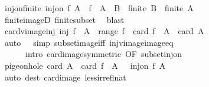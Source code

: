 \begin{isabellebody}
\ inj{\isacharunderscore}{\kern0pt}on{\isacharunderscore}{\kern0pt}finite{\isacharcolon}{\kern0pt}\ {\isachardoublequoteopen}inj{\isacharunderscore}{\kern0pt}on\ f\ A\ {\isasymLongrightarrow}\ f\ {\isacharbackquote}{\kern0pt}\ A\ {\isasymle}\ B\ {\isasymLongrightarrow}\ finite\ B\ {\isasymLongrightarrow}\ finite\ A{\isachardoublequoteclose}\isanewline
%
\isadelimproof
\ \ %
\endisadelimproof
%
\isatagproof
{}\isamarkupfalse%
\ finite{\isacharunderscore}{\kern0pt}imageD\ finite{\isacharunderscore}{\kern0pt}subset\ \isamarkupfalse%
\ blast%
\endisatagproof
{\isafoldproof}%
%
\isadelimproof
\isanewline
%
\endisadelimproof
\isanewline
{}\isamarkupfalse%
\ card{\isacharunderscore}{\kern0pt}vimage{\isacharunderscore}{\kern0pt}inj{\isacharcolon}{\kern0pt}\ {\isachardoublequoteopen}inj\ f\ {\isasymLongrightarrow}\ A\ {\isasymsubseteq}\ range\ f\ {\isasymLongrightarrow}\ card\ {\isacharparenleft}{\kern0pt}f\ {\isacharminus}{\kern0pt}{\isacharbackquote}{\kern0pt}\ A{\isacharparenright}{\kern0pt}\ {\isacharequal}{\kern0pt}\ card\ A{\isachardoublequoteclose}\isanewline
%
\isadelimproof
\ \ %
\endisadelimproof
%
\isatagproof
{}\isamarkupfalse%
\ {\isacharparenleft}{\kern0pt}auto\ {}\ {}\ simp{\isacharcolon}{\kern0pt}\ subset{\isacharunderscore}{\kern0pt}image{\isacharunderscore}{\kern0pt}iff\ inj{\isacharunderscore}{\kern0pt}vimage{\isacharunderscore}{\kern0pt}image{\isacharunderscore}{\kern0pt}eq\isanewline
\ \ \ \ \ \ intro{\isacharcolon}{\kern0pt}\ card{\isacharunderscore}{\kern0pt}image{\isacharbrackleft}{\kern0pt}symmetric{\isacharcomma}{\kern0pt}\ OF\ subset{\isacharunderscore}{\kern0pt}inj{\isacharunderscore}{\kern0pt}on{\isacharbrackright}{\kern0pt}{\isacharparenright}{\kern0pt}%
\endisatagproof
{\isafoldproof}%
%
\isadelimproof
%
\endisadelimproof
%
\isadelimdocument
%
\endisadelimdocument
%
\isatagdocument
%
\isamarkuptrue%
%
\endisatagdocument
{\isafolddocument}%
%
\isadelimdocument
%
\endisadelimdocument
{}\isamarkupfalse%
\ pigeonhole{\isacharcolon}{\kern0pt}\ {\isachardoublequoteopen}card\ A\ {\isachargreater}{\kern0pt}\ card\ {\isacharparenleft}{\kern0pt}f\ {\isacharbackquote}{\kern0pt}\ A{\isacharparenright}{\kern0pt}\ {\isasymLongrightarrow}\ {\isasymnot}\ inj{\isacharunderscore}{\kern0pt}on\ f\ A\ {\isachardoublequoteclose}\isanewline
%
\isadelimproof
\ \ %
\endisadelimproof
%
\isatagproof
{}\isamarkupfalse%
\ {\isacharparenleft}{\kern0pt}auto\ dest{\isacharcolon}{\kern0pt}\ card{\isacharunderscore}{\kern0pt}image\ less{\isacharunderscore}{\kern0pt}irrefl{\isacharunderscore}{\kern0pt}nat{\isacharparenright}{\kern0pt}%

\end{isabellebody}
